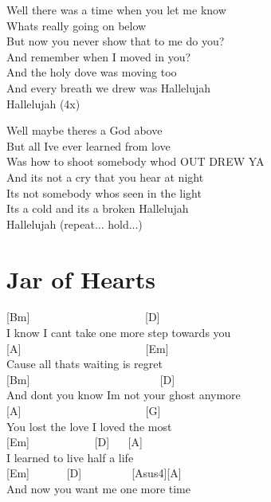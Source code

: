 \documentclass[
  letterpaper,
  twoside=false]{scrbook}
\begin{document}
Well there was a time when you let me know\\
What\textquotesingle s really going on below\\
But now you never show that to me do you?\\
And remember when I moved in you?\\
And the holy dove was moving too\\
And every breath we drew was Hallelujah\\
Hallelujah (4x)

Well maybe there\textquotesingle s a God above\\
But all I\textquotesingle ve ever learned from love\\
Was how to shoot somebody who\textquotesingle d OUT DREW YA\\
And it\textquotesingle s not a cry that you hear at night\\
It\textquotesingle s not somebody who\textquotesingle s seen in the
light\\
It\textquotesingle s a cold and it\textquotesingle s a broken
Hallelujah\\
Hallelujah (repeat... hold...)

\hypertarget{jar-of-hearts}{%
\chapter{Jar of Hearts}\label{jar-of-hearts}}

{[}Bm{]} ~ ~ ~ ~ ~ ~ ~ ~ ~ ~ ~ ~ {[}D{]}\\
I know I can\textquotesingle t take one more step towards you\\
{[}A{]} ~ ~ ~ ~ ~ ~ ~ ~ ~ ~ ~ ~ ~ {[}Em{]}\\
\textquotesingle Cause all thats waiting is regret\\
{[}Bm{]} ~ ~ ~ ~ ~ ~ ~ ~ ~ ~ ~ ~ ~ ~{[}D{]}\\
And don\textquotesingle t you know I\textquotesingle m not your ghost
anymore\\
{[}A{]} ~ ~ ~ ~ ~ ~ ~ ~ ~ ~ ~ ~ ~ {[}G{]}\\
You lost the love I loved the most\\
{[}Em{]} ~ ~ ~ ~ ~ ~ ~{[}D{]} ~ ~{[}A{]}\\
I learned to live half a life\\
{[}Em{]} ~ ~ ~ ~{[}D{]} ~ ~ ~ ~ ~ {[}Asus4{]}{[}A{]}\\
And now you want me one more time
\end{document}
